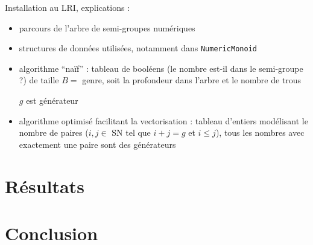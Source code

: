 \documentclass[12pt,a4paper]{article}
\let\leq\leqslant
\begin{document}
Installation au LRI, explications :
\begin{itemize}
	\item	parcours de l'arbre de semi-groupes numériques

	\item	structures de données utilisées, notamment dans \texttt{NumericMonoid}

	\item	algorithme ``naïf'' : tableau de booléens (le nombre est-il dans le semi-groupe ?) de taille $B =$ genre, soit la profondeur dans l'arbre et le nombre de trous
			\begin{algorithmic}
								\STATE $g$ est générateur
							\ENDIF
						\ENDFOR
					\ENDIF
				\ENDFOR
			\end{algorithmic}

	\item	algorithme optimisé facilitant la vectorisation : tableau d'entiers modélisant le nombre de paires ($i, j \in$ SN tel que $i + j = g$ et $i \leq j$), tous les nombres avec exactement une paire sont des générateurs
\end{itemize}

\section{Résultats}

\section*{Conclusion}
\end{document}
